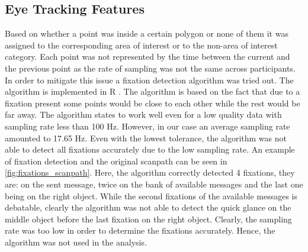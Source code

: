 \subsection{Eye Tracking Features}
\label{sec:analysis:eyetr}
Based on whether a point was inside a certain polygon or none of them it was assigned to the corresponding area of interest or to the non-area of interest category. Each point was not represented by the time between the current and the previous point as the rate of sampling was not the same across participants. In order to mitigate this issue a fixation detection algorithm was tried out. The algorithm is implemented in R \cite{fixation_detection}. The algorithm is based on the fact that due to a fixation present some points would be close to each other while the rest would be far away. The algorithm states to work well even for a low quality data with sampling rate less than 100 Hz. However, in our case an average sampling rate amounted to 17.65 Hz. Even with the lowest tolerance, the algorithm was not able to detect all fixations accurately due to the low sampling rate. An example of fixation detection and the original scanpath can be seen in \autoref{fig:fixations_scanpath}. Here, the algorithm correctly detected 4 fixations, they are: on the sent message, twice on the bank of available messages and the last one being on the right object. While the second fixations of the available messages is debatable, clearly the algorithm was not able to detect the quick glance on the middle object before the last fixation on the right object. Clearly, the sampling rate was too low in order to determine the fixations accurately. Hence, the algorithm was not used in the analysis. 

